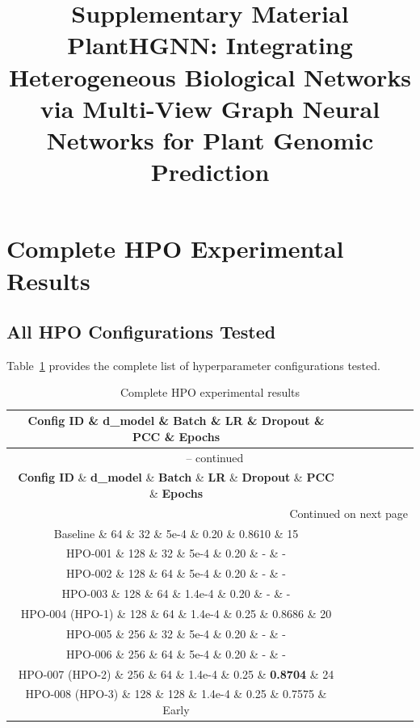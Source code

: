 \documentclass[11pt,a4paper]{article}
\title{\textbf{Supplementary Material}\\
\large PlantHGNN: Integrating Heterogeneous Biological Networks via Multi-View Graph Neural Networks for Plant Genomic Prediction}
\author{}
\date{}
\begin{document}
\maketitle

\tableofcontents
\newpage

\section{Complete HPO Experimental Results}
\label{sec:complete_hpo}

\subsection{All HPO Configurations Tested}
\label{subsec:all_configs}

Table~\ref{tab:all_hpo} provides the complete list of hyperparameter configurations tested.

\begin{longtable}{ccccccc}
\caption{Complete HPO experimental results} \label{tab:all_hpo} \\
\toprule
\textbf{Config ID} \& \textbf{d\_model} \& \textbf{Batch} \& \textbf{LR} \& \textbf{Dropout} \& \textbf{PCC} \& \textbf{Epochs} \\
\midrule
\endfirsthead
\multicolumn{7}{c}{\tablename\ \thetable{} -- continued} \\
\toprule
\textbf{Config ID} \& \textbf{d\_model} \& \textbf{Batch} \& \textbf{LR} \& \textbf{Dropout} \& \textbf{PCC} \& \textbf{Epochs} \\
\midrule
\endhead
\midrule
\multicolumn{7}{r}{Continued on next page} \\
\endfoot
\bottomrule
\endlastfoot
Baseline \& 64 \& 32 \& 5e-4 \& 0.20 \& 0.8610 \& 15 \\
HPO-001 \& 128 \& 32 \& 5e-4 \& 0.20 \& - \& - \\
HPO-002 \& 128 \& 64 \& 5e-4 \& 0.20 \& - \& - \\
HPO-003 \& 128 \& 64 \& 1.4e-4 \& 0.20 \& - \& - \\
HPO-004 (HPO-1) \& 128 \& 64 \& 1.4e-4 \& 0.25 \& 0.8686 \& 20 \\
HPO-005 \& 256 \& 32 \& 5e-4 \& 0.20 \& - \& - \\
HPO-006 \& 256 \& 64 \& 5e-4 \& 0.20 \& - \& - \\
HPO-007 (HPO-2) \& 256 \& 64 \& 1.4e-4 \& 0.25 \& \textbf{0.8704} \& 24 \\
HPO-008 (HPO-3) \& 128 \& 128 \& 1.4e-4 \& 0.25 \& 0.7575 \& Early \\
\end{longtable}
\end{document}
